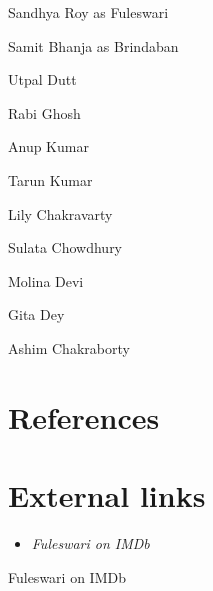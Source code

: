 Sandhya Roy as Fuleswari

Samit Bhanja as Brindaban

Utpal Dutt

Rabi Ghosh

Anup Kumar

Tarun Kumar

Lily Chakravarty

Sulata Chowdhury

Molina Devi

Gita Dey

Ashim Chakraborty

\section{References}\label{references}

\section{External links}\label{external-links}

\begin{itemize}
\item
  \emph{Fuleswari on IMDb}
\end{itemize}

Fuleswari on IMDb
